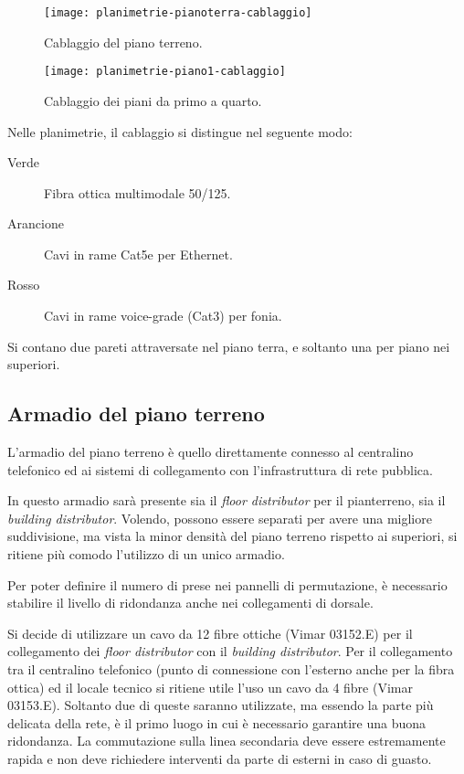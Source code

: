 \begin{figure}[ht]
  \texttt{[image: planimetrie-pianoterra-cablaggio]}
  \caption{Cablaggio del piano terreno.}\label{fig:planimetria-terreno-cablaggio}
\end{figure}

\begin{figure}[ht]
  \texttt{[image: planimetrie-piano1-cablaggio]}
  \caption{Cablaggio dei piani da primo a quarto.}\label{fig:planimetria-1-cablaggio}
\end{figure}

Nelle planimetrie, il cablaggio si distingue nel seguente modo:
\begin{description}
  \item[Verde] Fibra ottica multimodale 50/125.
  \item[Arancione] Cavi in rame Cat5e per Ethernet.
  \item[Rosso] Cavi in rame voice-grade (Cat3) per fonia.
\end{description}

Si contano due pareti attraversate nel piano terra, e soltanto una per piano nei superiori.

\subsection{Armadio del piano terreno}
L'armadio del piano terreno è quello direttamente connesso al centralino telefonico ed ai sistemi di collegamento con
l'infrastruttura di rete pubblica.

In questo armadio sarà presente sia il \textit{floor distributor} per il pianterreno, sia il \textit{building distributor}.
Volendo, possono essere separati per avere una migliore suddivisione, ma vista la minor densità del piano terreno rispetto
ai superiori, si ritiene più comodo l'utilizzo di un unico armadio.

Per poter definire il numero di prese nei pannelli di permutazione, è necessario stabilire il livello di ridondanza anche
nei collegamenti di dorsale.

Si decide di utilizzare un cavo da 12 fibre ottiche (Vimar 03152.E) per il collegamento dei \textit{floor distributor} con il \textit{building distributor}.
Per il collegamento tra il centralino telefonico (punto di connessione con l'esterno anche per la fibra ottica) ed il locale tecnico
si ritiene utile l'uso un cavo da 4 fibre (Vimar 03153.E). Soltanto due di queste saranno utilizzate, ma essendo la parte più delicata della rete, è il
primo luogo in cui è necessario garantire una buona ridondanza. La commutazione sulla linea secondaria deve essere estremamente rapida e non
deve richiedere interventi da parte di esterni in caso di guasto.

